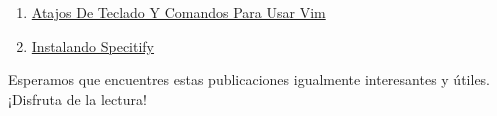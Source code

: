\documentclass[
  jou,
  floatsintext,
  longtable,
  a4paper,
  nolmodern,
  notxfonts,
  notimes,
  colorlinks=true,linkcolor=blue,citecolor=blue,urlcolor=blue]{apa7}
\begin{document}
\begin{enumerate}
{  Administracion Particiones Volumenes}
\item
  \href{https://achalmaedison.netlify.app/tecnologia-seguridad/operating-system/2023-07-01-atajos-de-teclado-y-comandos-para-usar-vim/index.pdf}{}
  \href{https://achalmaedison.netlify.app/tecnologia-seguridad/operating-system/2023-07-01-atajos-de-teclado-y-comandos-para-usar-vim}{Atajos
  De Teclado Y Comandos Para Usar Vim}
\item
  \href{https://achalmaedison.netlify.app/tecnologia-seguridad/operating-system/2024-07-15-instalando-specitify/index.pdf}{}
  \href{https://achalmaedison.netlify.app/tecnologia-seguridad/operating-system/2024-07-15-instalando-specitify}{Instalando
  Specitify}
\end{enumerate}

Esperamos que encuentres estas publicaciones igualmente interesantes y
útiles. ¡Disfruta de la lectura!
\end{document}
